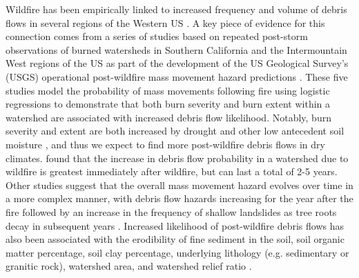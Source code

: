 \documentclass[nhess, manuscript]{copernicus}
\begin{document}
Wildfire has been empirically linked to increased frequency and volume
of debris flows in several regions of the Western US \citep{cannonWildfirerelatedDebrisFlow2005}. A key piece of evidence for this connection comes from a
series of studies based on repeated post-storm observations of burned
watersheds in Southern California and the Intermountain West regions of the US as part of
the development of the US Geological Survey's (USGS)
operational post-wildfire mass movement hazard predictions \citep{cannonPredictingProbabilityVolume2010, gartnerMutivariateStatisticalModels2009, gartnerEmpiricalModelsPredicting2014, rupertUsingLogisticRegression2003, staleyUpdatedLogisticRegression2016}. These five studies model the probability of mass movements following
fire using logistic regressions to demonstrate that both burn severity
\citep{staleyUpdatedLogisticRegression2016} and burn extent within a watershed \citep{cannonPredictingProbabilityVolume2010} are associated with increased debris flow likelihood. Notably, burn severity and extent are both increased by drought and other low antecedent soil moisture \citep{westerling2003interannual}, and thus we expect to find more post-wildfire debris flows in dry climates. \citet{gartnerEmpiricalModelsPredicting2014} found that the increase in debris flow probability in a
watershed due to wildfire is greatest immediately after wildfire, but can last a total of 2-5 years. Other studies suggest that the overall mass movement hazard evolves over time in a more complex manner, with debris flow hazards increasing for the year after the fire followed by an increase in the frequency of shallow landslides as tree roots decay in subsequent years \citep{rengersLandslidesWildfireInitiation2020,benda1997stochastic}. Increased likelihood of post-wildfire debris flows has also been associated with the erodibility of fine sediment in the soil, soil organic matter percentage, soil clay percentage, underlying lithology (e.g. sedimentary or granitic rock), watershed area, and watershed relief ratio \citep{gartnerMutivariateStatisticalModels2009, rupertUsingLogisticRegression2003,pelletier2014sediment}.
\end{document}
